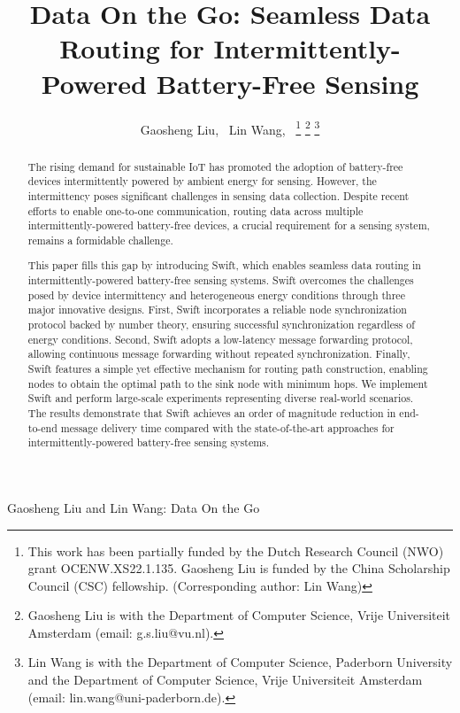 \documentclass[lettersize,journal]{IEEEtran}
\newcommand{\ours}{Swift\xspace}
\begin{document}
\title{Data On the Go: Seamless Data Routing for Intermittently-Powered Battery-Free Sensing}

\author{Gaosheng Liu,~ 
        Lin Wang,~
\thanks{This work has been partially funded by the Dutch Research Council (NWO) grant OCENW.XS22.1.135. Gaosheng Liu is funded by the China Scholarship Council (CSC) fellowship. (Corresponding author: Lin Wang)}
\thanks{Gaosheng Liu is with the Department of Computer Science, Vrije Universiteit Amsterdam (email: g.s.liu@vu.nl).}
\thanks{Lin Wang is with the Department of Computer Science, Paderborn University and the Department of Computer Science, Vrije Universiteit Amsterdam (email: lin.wang@uni-paderborn.de).}
}

{Gaosheng Liu and Lin Wang: Data On the Go}


\maketitle

\begin{abstract}
The rising demand for sustainable IoT has promoted the adoption of battery-free devices intermittently powered by ambient energy for sensing. However, the intermittency poses significant challenges in sensing data collection. Despite recent efforts to enable one-to-one communication, routing data across multiple intermittently-powered battery-free devices, a crucial requirement for a sensing system, remains a formidable challenge.

This paper fills this gap by introducing \ours, which enables seamless data routing in intermittently-powered battery-free sensing systems. \ours overcomes the challenges posed by device intermittency and heterogeneous energy conditions through three major innovative designs. First, \ours incorporates a reliable node synchronization protocol backed by number theory, ensuring successful synchronization regardless of energy conditions. Second, \ours adopts a low-latency message forwarding protocol, allowing continuous message forwarding without repeated synchronization. Finally, \ours features a simple yet effective mechanism for routing path construction, enabling nodes to obtain the optimal path to the sink node with minimum hops. We implement \ours and perform large-scale experiments representing diverse real-world scenarios. The results demonstrate that \ours achieves an order of magnitude reduction in end-to-end message delivery time compared with the state-of-the-art approaches for intermittently-powered battery-free sensing systems.
\end{abstract}
\end{document}
